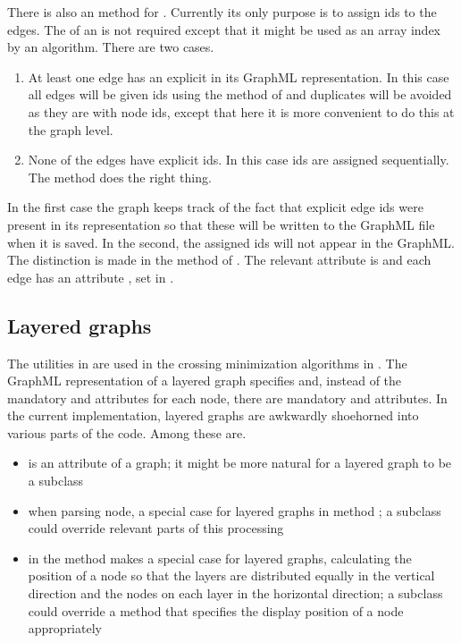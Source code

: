 There is also an  method for
. Currently its only purpose is to assign ids to the edges.
The  of an  is not required except
that it might be used as an array index by an algorithm. There are two cases.
\begin{enumerate}
\item At least one edge has an explicit  in its GraphML
  representation. In this case all edges will be given ids using the
   method of  and duplicates will be
  avoided as they are with node ids, except that here it is more convenient
  to do this at the graph level.
\item None of the edges have explicit ids. In this case ids are assigned
  sequentially. The 
  method does the right thing.
\end{enumerate}
In the first case the graph keeps track of the fact that explicit edge ids
were present in its representation so that these will be written to the
GraphML file when it is saved. In the second, the assigned ids will not
appear in the GraphML. The distinction is made in the 
method of .
The relevant attribute is 
and each edge has an attribute , set in
.

\subsection{Layered graphs}

The utilities in  are used in the crossing
minimization algorithms in .
The GraphML representation of a layered graph specifies 
and, instead of the mandatory  and  attributes for each node,
there are mandatory  and  attributes. In the
current implementation, layered graphs are awkwardly shoehorned into various
parts of the code. Among these are.

\begin{itemize}
\item {} is an attribute of a graph; it might be more natural for
  a layered graph to be a subclass
\item when parsing node, a special case for layered graphs in method
  ; a subclass  could
  override relevant parts of this processing
\item in  the method  makes a special
  case for layered graphs, calculating the position of a node so that the
  layers are distributed equally in the vertical direction and the nodes on
  each layer in the horizontal direction; a subclass could override a method
  that specifies the display position of a node appropriately
\end{itemize}

